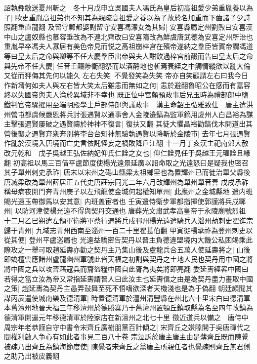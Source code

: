 詔執彝敏送夏州斬之　冬十月戊申立吳國夫人馮氏為皇后初高祖愛少弟重胤養以為子|{
	歐史重胤高祖弟也不知其為親疏高祖愛之養以為子故於名加重而下齒諸子少詩照翻重直龍翻}
及留守鄴都娶副留守安喜馮濛女為其婦|{
	安喜縣屬定州劉煦曰安喜漢中山之盧奴縣也慕容垂改為不連北齊改曰安喜隋改為鮮虞唐武德為安喜定州所治也}
重胤早卒馮夫人寡居有美色帝見而悦之高祖崩梓宫在殯帝遂納之羣臣皆賀帝謂馮道等曰皇太后之命與卿等不任大慶羣臣出帝與夫人酣飲過梓宫前醊而告曰皇太后之命與先帝不任大慶|{
	任音壬醊陟衛翻祭而以酒酹地也斬焉衰絰之中觸情縱欲以亂大倫又從而狎侮其先何以能久}
左右失笑|{
	不覺發笑為失笑}
帝亦自笑顧謂左右曰我今日作新壻何如夫人與左右皆大笑太后雖恚而無如之何|{
	恚於避翻魯昭公在感而有嘉容終以失國帝與夫人淪於異域非不幸也}
既正位中宫頗預政事后兄玉時為禮部郎中鹽鐵判官帝驟擢用至端明殿學士戶部侍郎與議政事　漢主命韶王弘雅致仕　唐主遣洪州營屯都虞候嚴恩將兵討張遇賢以通事舍人金陵邉鎬為監軍鎬用䖍州人白昌裕為謀主擊張遇賢屢破之遇賢禱於神神不復言|{
	復扶又翻}
其徒大懼昌裕勸鎬伐木開道出其營後襲之遇賢弃衆奔别將李台台知神無驗執遇賢以降斬於金陵市|{
	去年七月張遇賢作亂於漢境入唐境而亡史言依託怪妄之禍敗降戶江翻}
十一月丁亥漢主祀南郊大赦改元乾和　戊子吳越王弘佐納妃仰氏仁詮之女也|{
	仰仁詮見任于吳越王元瓘詮且緣翻}
初高祖以馬三百借平盧節度使楊光遠景延廣以詔命取之光遠怒曰是疑我也密召其子單州刺史承祚|{
	唐末以宋州之碭山縣梁太祖鄉里也為置輝州已而徙治單父縣後唐㓕梁改為單州薛居正五代史唐莊宗同光二年六月改輝州為單州單音善}
戊戌承祚稱母病夜開門奔青州庚子以左飛龍使金城何超權知單州|{
	此應州之金城縣地}
遣内班賜光遠玉帶御馬以安其意|{
	内班盖宦者也}
壬寅遣侍衛步軍都指揮使郭謹將兵戍鄆州|{
	以防河津使楊光遠不得與契丹交通也}
唐葬光文肅武孝高皇帝于永陵廟號烈祖　十二月乙巳朔遣左領軍衛將軍蔡行遇將兵戍鄆州楊光遠遣騎兵入淄州劫刺史翟進宗歸于青州|{
	九域志青州西南至淄州一百二十里翟萇伯翻}
甲寅徙楊承祚為登州刺史以從其便|{
	登州平盧巡屬也}
光遠益驕密告契丹以晉主負德違盟境内大饑公私困竭乘此際攻之一舉可取趙延夀亦勸之契丹主乃集山後及盧龍兵合五萬人使延夀將之|{
	山後即媯檀雲應諸州盧龍幽州軍號此皆天福之初割與契丹之土地人民也契丹用中國之將將中國之兵以攻晉藉寇兵而齎盜糧中國自此胥為夷矣將即亮翻}
委延夀經畧中國曰若得之當立汝為帝又常指延夀謂晉人曰此汝主也延夀信之由是為契丹盡力畫取中國之策|{
	趙延夀為契丹主愚弄鼔舞至死不悟嗜欲深者天機淺也是為于偽翻}
朝廷頗聞其謀丙辰遣使城南樂及德清軍|{
	時置德清軍於澶州清豐縣在州北六十里宋白曰德清軍本舊澶州地晉天福三年移澶州於德勝寨乃于舊澶州置頓丘鎮取縣為名至四年改鎮為德清軍開運元年移德清軍於陸家店在新澶州之北七十里}
徵近道兵以備之　唐侍中周宗年老恭謹自守中書令宋齊丘廣樹朋黨百計傾之|{
	宋齊丘之嫌隙開于吳唐禪代之間權利啟人争心有如此者事見二百八十卷}
宗泣訴於唐主唐主由是薄齊丘既而陳覺被疎乃出齊丘為鎮海節度使|{
	陳覺者宋齊丘之黨唐主所親任者也覺疎則齊丘無君側之助乃出被皮義翻}
